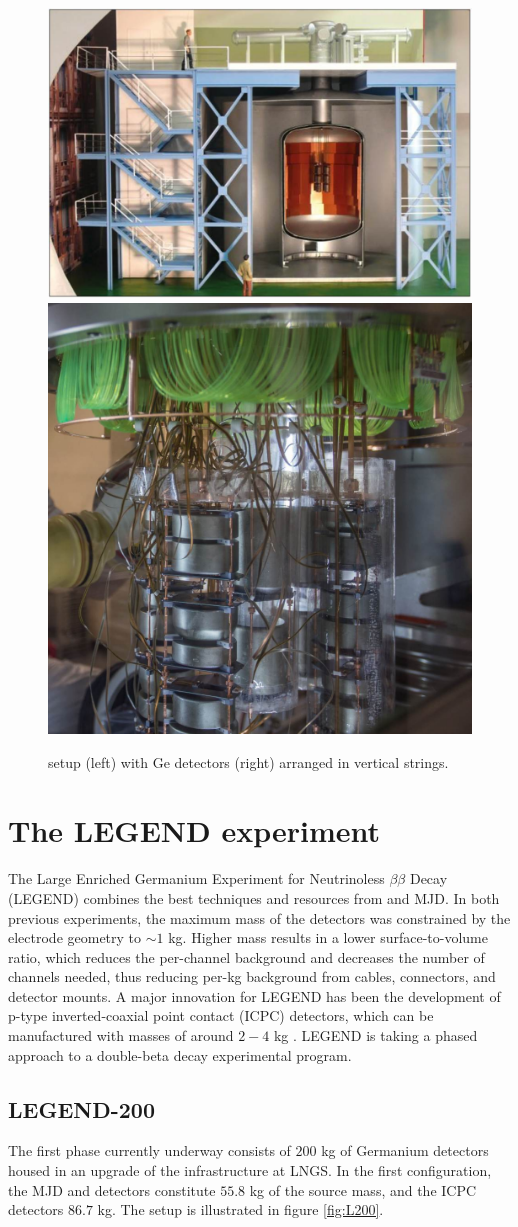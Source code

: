 \begin{figure}
\centering
\includegraphics[height=0.385\columnwidth]{ch2/figs/gerda_setup.pdf}
\qquad
\includegraphics[height=0.385\columnwidth]{ch2/figs/gerdastrings.pdf}
\caption{{\Gerda} setup (left) with Ge detectors (right) arranged in vertical strings.}
\label{ch2_fig_gerda_setup}
\end{figure}
  
\section{The LEGEND experiment}
The Large Enriched Germanium Experiment for Neutrinoless $\beta\beta$ Decay (LEGEND) combines the best techniques and resources from {\Gerda} and MJD. In both previous experiments, the maximum mass of the detectors was constrained by the electrode geometry to $\sim1$ kg. Higher mass results in a lower surface-to-volume ratio, which reduces the per-channel background and decreases the number of channels needed, thus reducing per-kg background from cables, connectors, and detector mounts. A major innovation for LEGEND has been the development of p-type inverted-coaxial point contact (ICPC) detectors, which can be manufactured with masses of around $2-4$ kg \cite{COOPER201125}. LEGEND is taking a phased approach to a double-beta decay experimental program.

\subsection{LEGEND-200}
The first phase currently underway consists of $200$ kg of Germanium detectors housed in an upgrade of the {\Gerda} infrastructure at LNGS. In the first configuration, the MJD and {\Gerda} detectors constitute $55.8$ kg of the source mass, and the ICPC detectors $86.7$ kg. The setup is illustrated in figure \ref{fig:L200}. 

